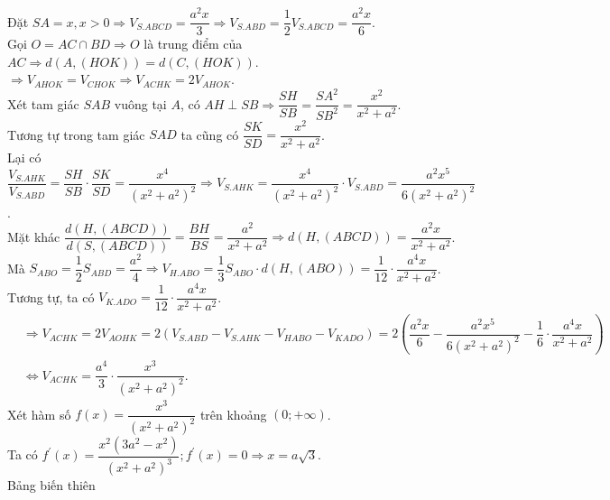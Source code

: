 \begin{ex}
{\begin{center}
		\end{center}
		Đặt $S A=x, x>0 \Rightarrow V_{S . A B C D}=\dfrac{a^2 x}{3}\Rightarrow V_{S . A B D}=\dfrac{1}{2}V_{S . A B C D}=\dfrac{a^2 x}{6}$.\\
		Gọi $O=A C \cap B D \Rightarrow O$ là trung điểm của $A C \Rightarrow d(A,(H O K))=d(C,(H O K))$.\\ 
		$\Rightarrow V_{AHOK}=V_{C H O K}\Rightarrow V_{A C H K}=2 V_{A H O K}$.\\
		Xét tam giác $S A B$ vuông tại $A$, có $A H \perp S B \Rightarrow \dfrac{S H}{S B}=\dfrac{S A^2}{S B^2}=\dfrac{x^2}{x^2+a^2}$.\\
		Tương tự trong tam giác $S A D$ ta cũng có $\dfrac{S K}{S D}=\dfrac{x^2}{x^2+a^2}$.\\
		Lại có $\dfrac{V_{S . A H K}}{V_{S . A B D}}=\dfrac{S H}{S B}\cdot \dfrac{S K}{S D}=\dfrac{x^4}{\left(x^2+a^2\right)^2}\Rightarrow V_{S . A H K}=\dfrac{x^4}{\left(x^2+a^2\right)^2}\cdot V_{S . A B D}=\dfrac{a^2 x^5}{6\left(x^2+a^2\right)^2}$.\\
		Mặt khác $\dfrac{d(H,(A B C D))}{d(S,(A B C D))}=\dfrac{B H}{B S}=\dfrac{a^2}{x^2+a^2}\Rightarrow d(H,(A B C D))=\dfrac{a^2 x}{x^2+a^2}$.\\
		Mà $S_{A B O}=\dfrac{1}{2}S_{A B D}=\dfrac{a^2}{4}\Rightarrow V_{H . A B O}=\dfrac{1}{3}S_{A B O}\cdot d(H,(A B O))=\dfrac{1}{12}\cdot \dfrac{a^4 x}{x^2+a^2}$.\\
		Tương tự, ta có $V_{K . A D O}=\dfrac{1}{12}\cdot \dfrac{a^4 x}{x^2+a^2}$.\\
		$\begin{aligned}
			& \Rightarrow V_{A C H K}=2 V_{A O H K}=2\left(V_{S . A B D}-V_{S . A H K}-V_{H A B O}-V_{K A D O}\right)=2\left(\dfrac{a^2 x}{6}-\dfrac{a^2 x^5}{6\left(x^2+a^2\right)^2}-\dfrac{1}{6}\cdot \dfrac{a^4 x}{x^2+a^2}\right) \\
			& \Leftrightarrow V_{A C H K}=\dfrac{a^4}{3}\cdot \dfrac{x^3}{\left(x^2+a^2\right)^2}.
		\end{aligned}$\\
		Xét hàm số $f(x)=\dfrac{x^3}{\left(x^2+a^2\right)^2}$ trên khoảng $(0 ;+\infty)$.\\
		Ta có $f^{\prime}(x)=\dfrac{x^2\left(3 a^2-x^2\right)}{\left(x^2+a^2\right)^3}; f^{\prime}(x)=0 \Rightarrow x=a \sqrt{3}$.\\
		Bảng biến thiên
		\begin{center}

\end{center}}
\end{ex}
